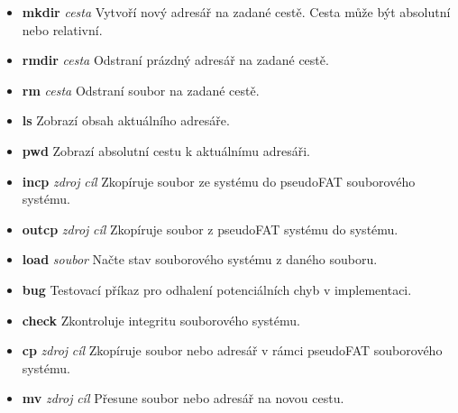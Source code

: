 \documentclass[12pt]{article}
\begin{document}
\begin{itemize}
    \item \textbf{mkdir} \textit{cesta} \newline
    Vytvoří nový adresář na zadané cestě. Cesta může být absolutní nebo relativní.

    \item \textbf{rmdir} \textit{cesta} \newline
    Odstraní prázdný adresář na zadané cestě.

    \item \textbf{rm} \textit{cesta} \newline
    Odstraní soubor na zadané cestě.

    \item \textbf{ls} \newline
    Zobrazí obsah aktuálního adresáře.

    \item \textbf{pwd} \newline
    Zobrazí absolutní cestu k aktuálnímu adresáři.

    \item \textbf{incp} \textit{zdroj} \textit{cíl} \newline
    Zkopíruje soubor ze systému do pseudoFAT souborového systému.

    \item \textbf{outcp} \textit{zdroj} \textit{cíl} \newline
    Zkopíruje soubor z pseudoFAT systému do systému.

    \item \textbf{load} \textit{soubor} \newline
    Načte stav souborového systému z daného souboru.

    \item \textbf{bug} \newline
    Testovací příkaz pro odhalení potenciálních chyb v implementaci.

    \item \textbf{check} \newline
    Zkontroluje integritu souborového systému.

    \item \textbf{cp} \textit{zdroj} \textit{cíl} \newline
    Zkopíruje soubor nebo adresář v rámci pseudoFAT souborového systému.

    \item \textbf{mv} \textit{zdroj} \textit{cíl} \newline
    Přesune soubor nebo adresář na novou cestu.


\end{itemize}
\end{document}
